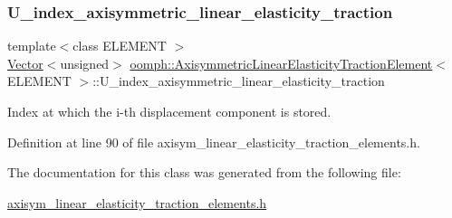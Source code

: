 \subsubsection{\texorpdfstring{U\+\_\+index\+\_\+axisymmetric\+\_\+linear\+\_\+elasticity\+\_\+traction}{U\_index\_axisymmetric\_linear\_elasticity\_traction}}
{\footnotesize\ttfamily template$<$class E\+L\+E\+M\+E\+NT $>$ \\
\hyperlink{classoomph_1_1Vector}{Vector}$<$unsigned$>$ \hyperlink{classoomph_1_1AxisymmetricLinearElasticityTractionElement}{oomph\+::\+Axisymmetric\+Linear\+Elasticity\+Traction\+Element}$<$ E\+L\+E\+M\+E\+NT $>$\+::U\+\_\+index\+\_\+axisymmetric\+\_\+linear\+\_\+elasticity\+\_\+traction\hspace{0.3cm}{\ttfamily [protected]}}



Index at which the i-\/th displacement component is stored. 



Definition at line 90 of file axisym\+\_\+linear\+\_\+elasticity\+\_\+traction\+\_\+elements.\+h.



The documentation for this class was generated from the following file\+:\begin{DoxyCompactItemize}
\item 
\hyperlink{axisym__linear__elasticity__traction__elements_8h}{axisym\+\_\+linear\+\_\+elasticity\+\_\+traction\+\_\+elements.\+h}\end{DoxyCompactItemize}
